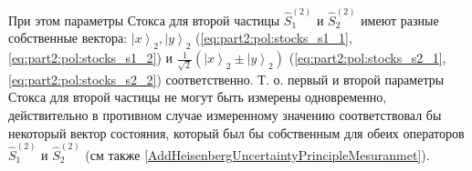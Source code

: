 При этом параметры Стокса для второй частицы  $\hat{S}_1^{(2)}$ и
$\hat{S}_2^{(2)}$ имеют 
разные собственные вектора:
$\left|x\right>_2, \left|y\right>_2$ (\ref{eq:part2:pol:stocks_s1_1},
  \ref{eq:part2:pol:stocks_s1_2}) и
$\frac{1}{\sqrt{2}}\left(\left|x\right>_2 \pm
\left|y\right>_2\right)$ (\ref{eq:part2:pol:stocks_s2_1},
  \ref{eq:part2:pol:stocks_s2_2}) соответственно.
Т. о. первый и второй параметры Стокса для второй частицы не могут
быть измерены одновременно, действительно в противном случае
измеренному значению соответствовал бы  
некоторый вектор состояния, который был бы собственным для обеих
операторов $\hat{S}_1^{(2)}$ и
$\hat{S}_2^{(2)}$ (см также
\autoref{AddHeisenbergUncertaintyPrincipleMesuranmet}). 





